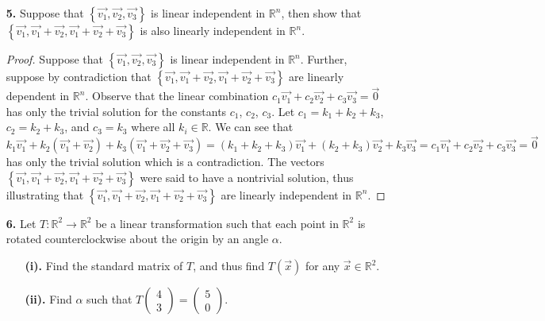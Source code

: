 \documentclass[ 12pt ]{article}
\begin{document}
\begin{enumerate}
	\item[\textbf{5.}] Suppose that $\left \{\vec{v_1}, \vec{v_2}, \vec{v_3} \right \}$ is linear independent in $\mathbb{R}^n$, then show that $\left \{\vec{v_1}, \vec{v_1}+\vec{v_2},
		\vec{v_1}+\vec{v_2}+\vec{v_3} \right \}$ is also linearly independent in $\mathbb{R}^n$.

	\begin{proof}
		Suppose that $\left \{\vec{v_1}, \vec{v_2}, \vec{v_3}\right \}$ is linear independent in $\mathbb{R}^n$. Further, suppose by contradiction that $\left \{\vec{v_1}, \vec{v_1}+\vec{v_2},
		\vec{v_1}+\vec{v_2}+\vec{v_3} \right \}$ are linearly dependent in $\mathbb{R}^n$. Observe that the linear combination $c_1\vec{v_1} + c_2\vec{v_2} + c_3\vec{v_3} =
		\vec{0}$ has only the trivial solution for the constants $c_1$, $c_2$, $c_3$. Let $c_1=k_1+k_2+k_3$, $c_2=k_2+k_3$, and $c_3=k_3$ where all $k_i \in \mathbb{R}$.
		We can see that $$k_1\vec{v_1} + k_2(\vec{v_1}+\vec{v_2}) + k_3(\vec{v_1}+\vec{v_2}+\vec{v_3}) = (k_1+k_2+k_3)\vec{v_1} + (k_2+k_3)\vec{v_2} + k_3\vec{v_3} =
		c_1\vec{v_1} + c_2\vec{v_2} + c_3\vec{v_3} = \vec{0}$$ has only the trivial solution which is a contradiction. The vectors $\left \{\vec{v_1}, \vec{v_1}+\vec{v_2},
		\vec{v_1}+\vec{v_2}+\vec{v_3} \right \}$ were said to have a nontrivial solution, thus illustrating that $\left \{\vec{v_1}, \vec{v_1}+\vec{v_2}, \vec{v_1}+\vec{v_2}+\vec{v_3} \right \}$
		are linearly independent in $\mathbb{R}^n$.
	\end{proof}


	\item[\textbf{6.}] Let $T : \mathbb{R}^2 \to \mathbb{R}^2$ be a linear transformation such that each point in $\mathbb{R}^2$ is rotated counterclockwise about the origin
		by an angle $\alpha$.
		\begin{enumerate}
			\item[\textbf{(i).}] Find the standard matrix of $T$, and thus find $T(\vec{x})$ for any $\vec{x} \in \mathbb{R}^2$.
			\item[\textbf{(ii).}] Find $\alpha$ such that $T\left (\begin{smallmatrix}4 \\ 3\end{smallmatrix} \right ) = \left (\begin{smallmatrix}5 \\ 0\end{smallmatrix} \right )$.
		\end{enumerate}


\end{enumerate}
\end{document}
